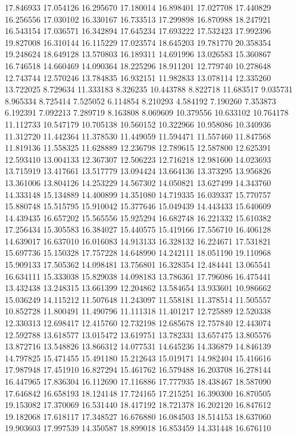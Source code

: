 17.846933
17.054126
16.295670
17.180014
16.898401
17.027708
17.440829
16.256556
17.030102
16.330167
16.733513
17.299898
16.870988
18.247921
16.543154
17.036571
16.342894
17.645234
17.693222
17.532423
17.992396
19.827008
16.310144
16.115229
17.023574
18.645203
19.781770
20.358354
19.248624
18.649128
13.570803
16.189311
14.691996
13.026583
15.360867
16.746518
14.660469
14.090364
18.225296
18.911201
12.779740
10.278648
12.743744
12.570246
13.784835
16.932151
11.982833
13.078114
12.335260
13.722025
8.729634
11.333183
8.326235
10.443788
8.822718
11.683517
9.035731
8.965334
8.725414
7.525052
6.114854
8.210293
4.584192
7.190260
7.353873
6.192391
7.092213
7.289719
8.163808
8.069609
10.379556
10.633102
10.764178
11.112733
10.547179
10.705138
10.560152
10.322966
10.958086
10.340936
11.312720
11.442364
11.378530
11.449059
11.594471
11.557460
11.847568
11.819136
11.558325
11.628889
12.236798
12.789615
12.587800
12.625391
12.593410
13.004133
12.367307
12.506223
12.716218
12.981600
14.023693
13.715919
13.417661
13.517779
13.094424
13.664136
13.373295
13.956826
13.361006
13.804126
14.253229
14.567302
14.050821
13.627499
14.343760
14.333148
15.134889
14.400899
14.351080
14.719335
16.039337
15.770757
15.880748
15.515795
15.910042
15.377646
15.049439
14.443433
15.640609
14.439435
16.657202
15.565556
15.925294
16.682748
16.221332
15.610382
17.256434
15.305583
16.384027
15.440575
15.419166
17.556710
16.406128
14.639017
16.637010
16.016083
14.913133
16.328132
16.224671
17.531821
15.697736
15.150328
17.757228
14.648990
14.242111
18.051190
19.110968
15.909133
17.505362
14.098481
13.756801
16.328354
12.484441
13.065541
16.634111
15.333038
15.829038
14.098183
13.786361
17.796086
16.475441
13.432438
13.248315
13.661399
12.204862
13.584654
13.933601
10.986662
15.036249
14.115212
11.507648
11.243097
11.558181
11.378514
11.505557
10.852728
11.800491
11.490796
11.111318
11.401217
12.725889
12.520338
12.330313
12.698417
12.415760
12.732198
12.685678
12.757840
12.443074
12.592788
13.618577
13.015472
13.619751
13.782331
13.657475
13.805576
13.872716
13.548826
13.866312
14.077531
14.645236
14.336879
14.846139
14.797825
15.471455
15.491180
15.212643
15.019171
14.982404
15.416616
17.987948
17.451910
16.827294
15.461762
16.579488
16.203708
16.278144
16.447965
17.836304
16.112690
17.116886
17.777935
18.438467
18.587090
17.646842
16.658193
18.124148
17.724165
17.215251
16.390300
16.870505
19.153082
17.370069
16.531440
18.417192
18.721378
16.202120
16.847612
19.182068
17.618117
17.348527
16.676880
16.084503
18.514153
18.637060
19.903603
17.997539
14.350587
18.899018
16.853459
14.331448
16.676110
